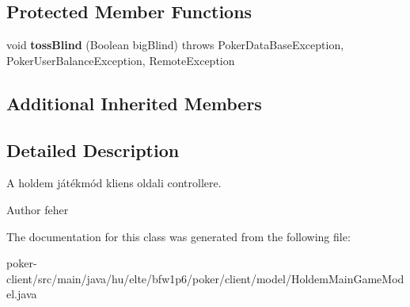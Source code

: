 \subsection*{Protected Member Functions}
\begin{DoxyCompactItemize}
\item 
\hypertarget{classhu_1_1elte_1_1bfw1p6_1_1poker_1_1client_1_1model_1_1_holdem_main_game_model_a6d3b1e0b16387c8eb901ac98e660ddf0}{}void {\bfseries toss\+Blind} (Boolean big\+Blind)  throws Poker\+Data\+Base\+Exception, Poker\+User\+Balance\+Exception, Remote\+Exception \label{classhu_1_1elte_1_1bfw1p6_1_1poker_1_1client_1_1model_1_1_holdem_main_game_model_a6d3b1e0b16387c8eb901ac98e660ddf0}

\end{DoxyCompactItemize}
\subsection*{Additional Inherited Members}


\subsection{Detailed Description}
A holdem játékmód kliens oldali controllere. \begin{DoxyAuthor}{Author}
feher 
\end{DoxyAuthor}


The documentation for this class was generated from the following file\+:\begin{DoxyCompactItemize}
\item 
poker-\/client/src/main/java/hu/elte/bfw1p6/poker/client/model/Holdem\+Main\+Game\+Model.\+java\end{DoxyCompactItemize}
